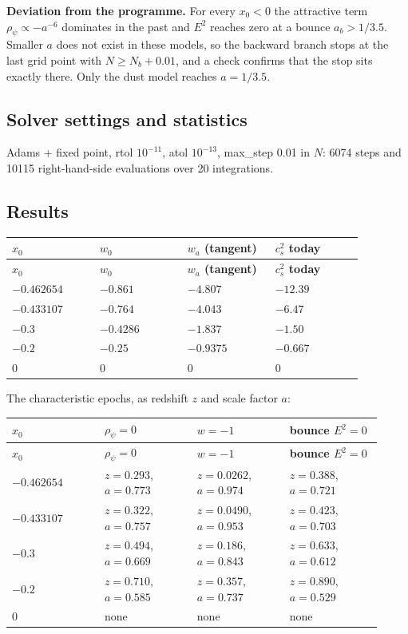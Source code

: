 \documentclass[11pt]{article}
\begin{document}
\textbf{Deviation from the programme.} For every $x_0<0$ the attractive term $\rho_\psi\propto-a^{-6}$ dominates in the past and $E^2$ reaches zero at a bounce $a_b>1/3.5$. Smaller $a$ does not exist in these models, so the backward branch stops at the last grid point with $N\ge N_b+0.01$, and a check confirms that the stop sits exactly there. Only the dust model reaches $a=1/3.5$.

\subsection{Solver settings and statistics}

Adams + fixed point, rtol $10^{-11}$, atol $10^{-13}$, max\_step 0.01 in $N$: 6074 steps and 10115 right-hand-side evaluations over 20 integrations.

\subsection{Results}

\begin{longtable}{@{}p{0.230\linewidth}p{0.230\linewidth}p{0.230\linewidth}p{0.230\linewidth}@{}}
\toprule
\textbf{$x_0$} & \textbf{$w_0$} & \textbf{$w_a$ (tangent)} & \textbf{$c_s^2$ today} \\
\midrule
\endfirsthead
\toprule
\textbf{$x_0$} & \textbf{$w_0$} & \textbf{$w_a$ (tangent)} & \textbf{$c_s^2$ today} \\
\midrule
\endhead
$-0.462654$ & $-0.861$ & $-4.807$ & $-12.39$ \\
$-0.433107$ & $-0.764$ & $-4.043$ & $-6.47$ \\
$-0.3$ & $-0.4286$ & $-1.837$ & $-1.50$ \\
$-0.2$ & $-0.25$ & $-0.9375$ & $-0.667$ \\
0 & 0 & 0 & 0 \\
\bottomrule
\end{longtable}

The characteristic epochs, as redshift $z$ and scale factor $a$:

\begin{longtable}{@{}p{0.230\linewidth}p{0.230\linewidth}p{0.230\linewidth}p{0.230\linewidth}@{}}
\toprule
\textbf{$x_0$} & \textbf{$\rho_\psi=0$} & \textbf{$w=-1$} & \textbf{bounce $E^2=0$} \\
\midrule
\endfirsthead
\toprule
\textbf{$x_0$} & \textbf{$\rho_\psi=0$} & \textbf{$w=-1$} & \textbf{bounce $E^2=0$} \\
\midrule
\endhead
$-0.462654$ & $z=0.293$, $a=0.773$ & $z=0.0262$, $a=0.974$ & $z=0.388$, $a=0.721$ \\
$-0.433107$ & $z=0.322$, $a=0.757$ & $z=0.0490$, $a=0.953$ & $z=0.423$, $a=0.703$ \\
$-0.3$ & $z=0.494$, $a=0.669$ & $z=0.186$, $a=0.843$ & $z=0.633$, $a=0.612$ \\
$-0.2$ & $z=0.710$, $a=0.585$ & $z=0.357$, $a=0.737$ & $z=0.890$, $a=0.529$ \\
0 & none & none & none \\
\bottomrule
\end{longtable}
\end{document}

